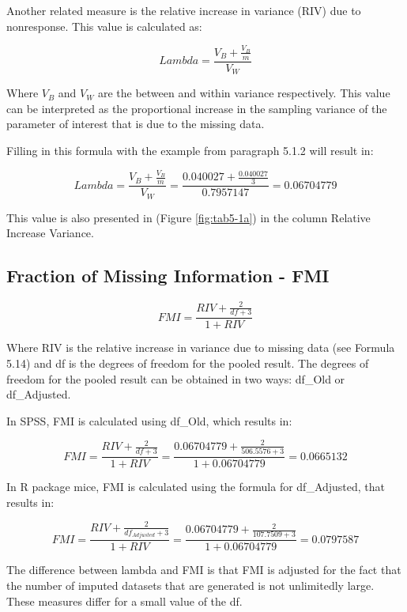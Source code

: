 \documentclass[]{book}
\theoremstyle{definition}
\theoremstyle{definition}
\theoremstyle{definition}
\theoremstyle{remark}
\begin{document}
Another related measure is the relative increase in variance (RIV) due
to nonresponse. This value is calculated as:

\begin{equation}
Lambda = \frac{V_B + \frac{V_B}{m}}{V_W}
  \label{eq:riv}
\end{equation}

Where \({V_B}\) and \({V_W}\) are the between and within variance
respectively. This value can be interpreted as the proportional increase
in the sampling variance of the parameter of interest that is due to the
missing data.

Filling in this formula with the example from paragraph 5.1.2 will
result in:

\[Lambda = \frac{V_B + \frac{V_B}{m}}{V_W}=\frac{0.040027 + \frac{0.040027}{3}}{0.7957147}=0.06704779\]

This value is also presented in (Figure \ref{fig:tab5-1a}) in the column
Relative Increase Variance.

\subsection{Fraction of Missing Information -
FMI}\label{fraction-of-missing-information---fmi}

\begin{equation}
FMI = \frac{RIV + \frac{2}{df+3}}{1+RIV}
  \label{eq:riv}
\end{equation}

Where RIV is the relative increase in variance due to missing data (see
Formula 5.14) and df is the degrees of freedom for the pooled result.
The degrees of freedom for the pooled result can be obtained in two
ways: df\_Old or df\_Adjusted.

In SPSS, FMI is calculated using df\_Old, which results in:

\[FMI = \frac{RIV + \frac{2}{df+3}}{1+RIV}=\frac{0.06704779 + \frac{2}{506.5576+3}}{1+0.06704779}=0.0665132\]

In R package mice, FMI is calculated using the formula for df\_Adjusted,
that results in:

\[FMI = \frac{RIV + \frac{2}{df_{Adjusted}+3}}{1+RIV}=\frac{0.06704779 + \frac{2}{107.7509+3}}{1+0.06704779}=0.0797587\]

The difference between lambda and FMI is that FMI is adjusted for the
fact that the number of imputed datasets that are generated is not
unlimitedly large. These measures differ for a small value of the df.
\end{document}
